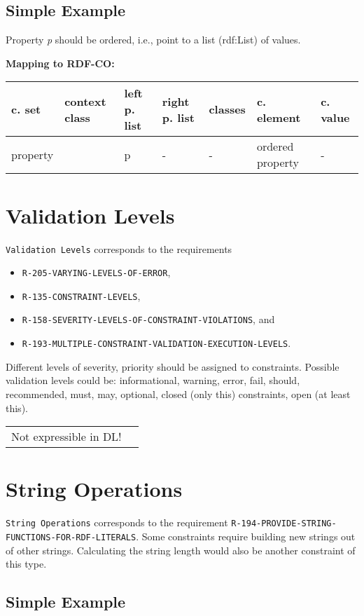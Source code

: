 \documentclass{llncs}
\newcommand{\ms}[1]{\texttt{#1}}
\newenvironment{gcotable}{
  \scriptsize
  \sffamily
  \vspace{0cm}
	\begin{center}
	\textbf{\vspace{0.4cm}Mapping to RDF-CO:} \\
  \begin{tabular}{l|l|l|l|l|l|l}
	\hline
  \textbf{c. set} & \textbf{context class} & \textbf{left p. list} & \textbf{right p. list} & \textbf{classes} & \textbf{c. element} & \textbf{c. value} \\
  \hline

}{
  \hline
  \end{tabular}
	\end{center}
}
\newenvironment{DL}{
\vspace{0cm}
	\begin{center}
  \begin{tabular}{r l}

}{
  \end{tabular}
	\end{center}
}
\begin{document}
\subsection{Simple Example}

Property \emph{p} should be ordered, i.e., point to a list (rdf:List) of values.

\begin{gcotable}
property &  & p & - & - & ordered property & - \\
\end{gcotable}

\section{Validation Levels}

\ms{Validation Levels} corresponds to the requirements

\begin{itemize}
	\item \ms{R-205-VARYING-LEVELS-OF-ERROR},
	\item \ms{R-135-CONSTRAINT-LEVELS},
	\item \ms{R-158-SEVERITY-LEVELS-OF-CONSTRAINT-VIOLATIONS}, and
	\item \ms{R-193-MULTIPLE-CONSTRAINT-VALIDATION-EXECUTION-LEVELS}.
\end{itemize}

Different levels of severity, priority should be assigned to constraints.
Possible validation levels could be: informational, warning, error, fail, should, recommended, must, may, optional, closed (only this) constraints, open (at least this).

\begin{DL}
Not expressible in DL!
\end{DL}

\section{String Operations}

\ms{String Operations} corresponds to the requirement
\ms{R-194-PROVIDE-STRING-} \ms{FUNCTIONS-FOR-RDF-LITERALS}.
Some constraints require building new strings out of other strings.
Calculating the string length would also be another constraint of this type.

\subsection{Simple Example}
\end{document}
